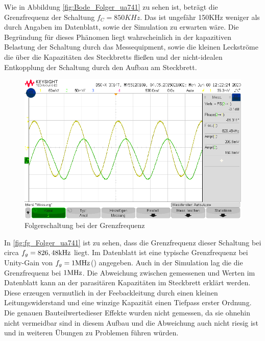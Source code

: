 Wie in Abbildung \ref{fig:Bode_Folger_ua741} zu sehen ist, beträgt die Grenzfrequenz der Schaltung $f_C=850KHz$. Das ist ungefähr 150KHz weniger als durch Angaben im Datenblatt, sowie der Simulation zu erwarten wäre. Die Begründung für dieses Phänomen liegt wahrscheinlich in der kapazitiven Belastung der Schaltung durch das Messequipment, sowie die kleinen Leckströme die über die Kapazitäten des Steckbretts fließen und der nicht-idealen Entkopplung der Schaltung durch den Aufbau am Steckbrett. 
\begin{figure}[H]
    \centering
    \includegraphics[width=\costumPicWidth]{Lab_1/Messungen/Folger/fg.png}
    \caption{Folgerschaltung bei der Grenzfrequenz}
    \label{fig:fg_Folger_ua741}
\end{figure}
In \autoref{fig:fg_Folger_ua741} ist zu sehen, dass die Grenzfrequenz dieser Schaltung bei circa $f_g=826,48\text{kHz}$ liegt. Im Datenblatt ist eine typische Grenzfrequenz bei Unity-Gain von $f_g=1\text{MHz}$(\cite[9]{ti:ua741}) angegeben. Auch in der Simulation lag die die Grenzfrequenz bei $1\text{MHz}$. Die Abweichung zwischen gemessenen und Werten im Datenblatt kann an der parasitären Kapazitäten im Steckbrett erklärt werden. Diese erzeugen vermutlich in der Feebackleitung durch einen kleinen Leitungswiderstand und eine winzige Kapazität einen Tiefpass erster Ordnung. Die genauen \glqq Bauteilwerte\grqq dieser Effekte wurden nicht gemessen, da sie ohnehin nicht vermeidbar sind in diesem Aufbau und die Abweichung auch nicht riesig ist und in weiteren Übungen zu Problemen führen würden.

